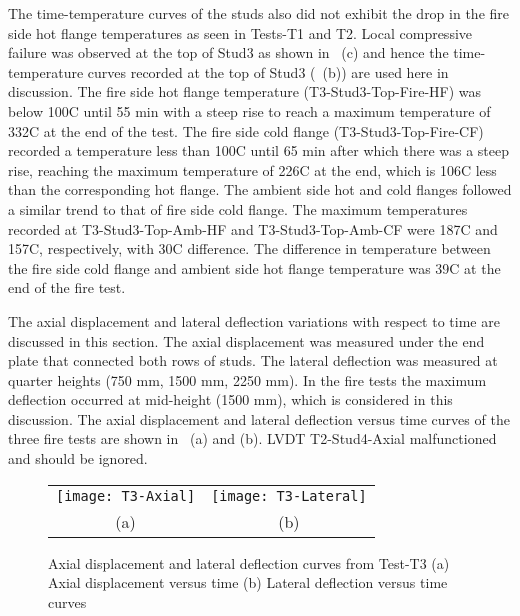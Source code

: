 The time-temperature curves of the studs also did not exhibit the drop in the fire side hot flange temperatures as seen in Tests-T1 and T2. Local compressive failure was observed at the top of Stud3 as shown in ~(c) and hence the time-temperature curves recorded at the top of Stud3 (~(b)) are used here in discussion. The fire side hot flange temperature (T3-Stud3-Top-Fire-HF) was below 100\degree C until 55 min with a steep rise to reach a maximum temperature of 332\degree C at the end of the test. The fire side cold flange (T3-Stud3-Top-Fire-CF) recorded a temperature less than 100\degree C until 65 min after which there was a steep rise, reaching the maximum temperature of 226\degree C at the end, which is 106\degree C less than the corresponding hot flange. The ambient side hot and cold flanges followed a similar trend to that of fire side cold flange. The maximum temperatures recorded at T3-Stud3-Top-Amb-HF and T3-Stud3-Top-Amb-CF were 187\degree C and 157\degree C, respectively, with 30\degree C difference. The difference in temperature between the fire side cold flange and ambient side hot flange temperature was 39\degree C at the end of the fire test.

The axial displacement and lateral deflection variations with respect to time are discussed in this section. The axial displacement was measured under the end plate that connected both rows of studs. The lateral deflection was measured at quarter heights (750 mm, 1500 mm, 2250 mm). In the fire tests the maximum deflection occurred at mid-height (1500 mm), which is considered in this discussion. The axial displacement and lateral deflection versus time curves of the three fire tests are shown in ~(a) and (b). LVDT T2-Stud4-Axial malfunctioned and should be ignored.
\begin{figure}[!htbp]
	\centering
		\begin{tabular}{cc}
			\texttt{[image: T3-Axial]} & \texttt{[image: T3-Lateral]} \\
			(a) & (b) \\
		\end{tabular} 
		\caption{Axial displacement and lateral deflection curves from Test-T3 (a) Axial displacement versus time (b) Lateral deflection versus time curves}
		\label{fig:T3-Axial-Lateral}
\end{figure}


